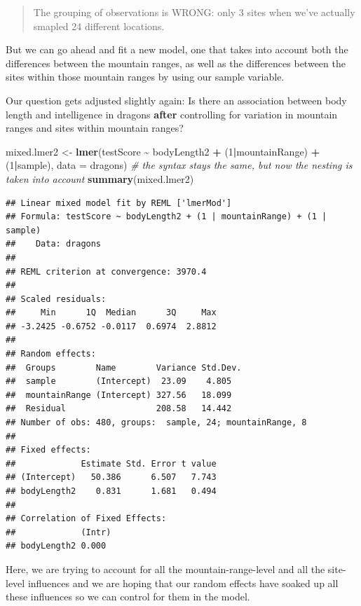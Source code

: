 \documentclass[
]{article}
\newenvironment{Shaded}{\begin{snugshade}}{\end{snugshade}}
\newcommand{\AttributeTok}[1]{\textcolor[rgb]{0.13,0.29,0.53}{#1}}
\newcommand{\CommentTok}[1]{\textcolor[rgb]{0.56,0.35,0.01}{\textit{#1}}}
\newcommand{\DecValTok}[1]{\textcolor[rgb]{0.00,0.00,0.81}{#1}}
\newcommand{\FunctionTok}[1]{\textcolor[rgb]{0.13,0.29,0.53}{\textbf{#1}}}
\newcommand{\NormalTok}[1]{#1}
\newcommand{\OtherTok}[1]{\textcolor[rgb]{0.56,0.35,0.01}{#1}}
\newcommand{\SpecialCharTok}[1]{\textcolor[rgb]{0.81,0.36,0.00}{\textbf{#1}}}
\begin{document}
\begin{quote}
The grouping of observations is WRONG: only 3 sites when we've actually
smapled 24 different locations.
\end{quote}

But we can go ahead and fit a new model, one that takes into account
both the differences between the mountain ranges, as well as the
differences between the sites within those mountain ranges by using our
sample variable.

Our question gets adjusted slightly again: Is there an association
between body length and intelligence in dragons \textbf{after}
controlling for variation in mountain ranges and sites within mountain
ranges?

\begin{Shaded}
\begin{Highlighting}[]
\NormalTok{mixed.lmer2 }\OtherTok{\textless{}{-}} \FunctionTok{lmer}\NormalTok{(testScore }\SpecialCharTok{\textasciitilde{}}\NormalTok{ bodyLength2 }\SpecialCharTok{+}\NormalTok{ (}\DecValTok{1}\SpecialCharTok{|}\NormalTok{mountainRange) }\SpecialCharTok{+}\NormalTok{ (}\DecValTok{1}\SpecialCharTok{|}\NormalTok{sample), }\AttributeTok{data =}\NormalTok{ dragons)  }\CommentTok{\# the syntax stays the same, but now the nesting is taken into account}
\FunctionTok{summary}\NormalTok{(mixed.lmer2)}
\end{Highlighting}
\end{Shaded}

\begin{verbatim}
## Linear mixed model fit by REML ['lmerMod']
## Formula: testScore ~ bodyLength2 + (1 | mountainRange) + (1 | sample)
##    Data: dragons
## 
## REML criterion at convergence: 3970.4
## 
## Scaled residuals: 
##     Min      1Q  Median      3Q     Max 
## -3.2425 -0.6752 -0.0117  0.6974  2.8812 
## 
## Random effects:
##  Groups        Name        Variance Std.Dev.
##  sample        (Intercept)  23.09    4.805  
##  mountainRange (Intercept) 327.56   18.099  
##  Residual                  208.58   14.442  
## Number of obs: 480, groups:  sample, 24; mountainRange, 8
## 
## Fixed effects:
##             Estimate Std. Error t value
## (Intercept)   50.386      6.507   7.743
## bodyLength2    0.831      1.681   0.494
## 
## Correlation of Fixed Effects:
##             (Intr)
## bodyLength2 0.000
\end{verbatim}

Here, we are trying to account for all the mountain-range-level and all
the site-level influences and we are hoping that our random effects have
soaked up all these influences so we can control for them in the model.
\end{document}
